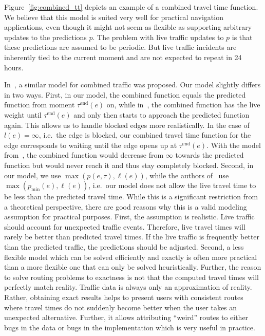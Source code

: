\documentclass[a4paper,UKenglish,cleveref, autoref, thm-restate,anonymous]{lipics-v2021}
\newcommand*{\pred}{p}
\newcommand*{\live}{\ell}
\newcommand*{\tend}{\tau^{\operatorname{end}}}
\begin{document}
Figure~\ref{fig:combined_tt} depicts an example of a combined travel time function.
We believe that this model is suited very well for practical navigation applications, even though it might not seem as flexible as supporting arbitrary updates to the predictions $\pred$.
The problem with live traffic updates to $\pred$ is that these predictions are assumed to be periodic.
But live traffic incidents are inherently tied to the current moment and are not expected to repeat in 24 hours.

In~\cite{strasser_et_al:LIPIcs.SEA.2021.6}, a similar model for combined traffic was proposed.
Our model slightly differs in two ways.
First, in our model, the combined function equals the predicted function from moment $\tend(e)$ on, while in~\cite{strasser_et_al:LIPIcs.SEA.2021.6}, the combined function has the live weight until $\tend(e)$ and only then starts to approach the predicted function again.
This allows us to handle blocked edges more realistically.
In the case of $l(e) = \infty$, i.e.\ the edge is blocked, our combined travel time function for the edge corresponds to waiting until the edge opens up at $\tend(e)$.
With the model from~\cite{strasser_et_al:LIPIcs.SEA.2021.6}, the combined function would decrease from $\infty$ towards the predicted function but would never reach it and thus stay completely blocked.
Second, in our model, we use $\max(p(e, \tau), \live(e))$, while the authors of~\cite{strasser_et_al:LIPIcs.SEA.2021.6} use $\max(p_{\min}(e), \live(e))$, i.e.\ our model does not allow the live travel time to be less than the predicted travel time.
While this is a significant restriction from a theoretical perspective, there are good reasons why this is a valid modeling assumption for practical purposes.
First, the assumption is realistic.
Live traffic should account for unexpected traffic events.
Therefore, live travel times will rarely be better than predicted travel times.
If the live traffic is frequently better than the predicted traffic, the predictions should be adjusted.
Second, a less flexible model which can be solved efficiently and exactly is often more practical than a more flexible one that can only be solved heuristically.
Further, the reason to solve routing problems to exactness is not that the computed travel times will perfectly match reality.
Traffic data is always only an approximation of reality.
Rather, obtaining exact results helps to present users with consistent routes where travel times do not suddenly become better when the user takes an unexpected alternative.
Further, it allows attributing ``weird'' routes to either bugs in the data or bugs in the implementation which is very useful in practice.
\end{document}
